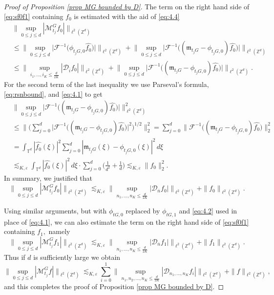 \documentclass[a4paper,oneside, reqno]{amsart}
\numberwithin{equation}{section}
\theoremstyle{definition}%
\theoremstyle{definition}
\theoremstyle{definition}%
\theoremstyle{definition}
\newcommand{\Z}{\mathbb{Z}}
\newcommand{\T}{\mathbb{T}}
\begin{document}
\begin{proof}[Proof of Proposition \ref{prop MG bounded by D}]
The  term on the right hand side of \eqref{eq:sf0f1}  containing $f_0$ is estimated with the aid of \eqref{eq:4.4} 
\begin{align*}
&\Big\|\sup_{0 \le j \le d} |\mathcal{M}_{t_j}^Gf_0| \Big\|_{\ell^2(\Z^d)} \\
&\leq \Big\|  \sup_{0 \le j \le d} \Big|\mathcal{F}^{-1} \Big( \phi_{t_jG,0}\widehat{f_0} \Big)\Big| \Big\|_{\ell^2(\Z^d)} +\Big\|  \sup_{ 0 \le j \le d} \Big|\mathcal{F}^{-1} \Big( (\mathfrak{m}_{t_jG}-\phi_{t_jG,0})\widehat{f_0} \Big)\Big| \Big\|_{\ell^2(\Z^d)}\\
&\le \Big\|\sup_{i_1,...,i_K \leq \frac{d}{2K}} |\mathcal{D}_{\overline{i}}f_0|\Big\|_{\ell^2(\Z^d)}+\Big\|  \sup_{ 0 \le j \le d} \Big|\mathcal{F}^{-1} \Big( (\mathfrak{m}_{t_jG}-\phi_{t_jG,0})\widehat{f_0} \Big)\Big| \Big\|_{\ell^2(\Z^d)}.
\end{align*} 
For the second term of the last inequality we use Parseval's formula, \eqref{eq:rsnbound}, and \eqref{eq:4.1} to get
\begin{align*}
&\Big\|  \sup_{ 0 \le j \le d} \Big|\mathcal{F}^{-1} \Big( (\mathfrak{m}_{t_jG}-\phi_{t_jG,0})\widehat{f_0} \Big)\Big| \Big\|_{\ell^2(\Z^d)}^2 \\
&\leq \Big\| \Big(\sum_{j=0}^d \Big|\mathcal{F}^{-1} \Big( (\mathfrak{m}_{t_jG}-\phi_{t_jG,0})\widehat{f_0} \Big)\Big|^2 \Big)^{1/2} \Big\|_{2}^2 =\sum_{j=0}^d \Big\|\mathcal{F}^{-1} \Big( (\mathfrak{m}_{t_jG}-\phi_{t_jG,0})\widehat{f_0} \Big)\Big\|_{2}^2  \\
&=  \int_{\T^d} | \widehat{f_0}(\xi)|^2 \sum_{j=0}^d  |\mathfrak{m}_{t_jG}(\xi)-\phi_{t_jG,0}(\xi)|^2 \,d\xi 
\\
&\lesssim_{K, \varepsilon}  \int_{\T^d} | \widehat{f_0}(\xi)|^2\,d\xi \cdot \sum_{j=0}^d\big( \frac{1}{d^2}+ \frac{1}{d}\big)  \lesssim_{K, \varepsilon} \| f_0 \|_2^2.
\end{align*}
In summary, we justified that
\[
\Big\|\sup_{0 \le j \le d} |\mathcal{M}_{t_j}^Gf_0| \Big\|_{\ell^2(\Z^d)} \lesssim_{K,\varepsilon}  \Big\| \sup_{n_1,...,n_K \leq \frac{d}{2K}} |\mathcal{D}_{\overline{n}}f_0| \Big\|_{\ell^2(\Z^d)}+ \|f_0 \|_{\ell^2(\Z^d)}.
\]

Using similar arguments, but with $\phi_{tG,0}$ replaced by $\phi_{tG,1}$ and \eqref{eq:4.2} used in place of \eqref{eq:4.1}, we can also estimate the term on the right hand side of \eqref{eq:sf0f1} containing $f_1,$ namely
\[
\Big\|\sup_{0 \le j \le d} |\mathcal{M}_{t_j}^Gf_1| \Big\|_{\ell^2(\Z^d)} \lesssim_{K,\varepsilon}  \Big\| \sup_{n_1,...,n_K \leq \frac{d}{2K}} |\mathcal{D}_{\overline{n}}f_1| \Big\|_{\ell^2(\Z^d)}+ \|f_1 \|_{\ell^2(\Z^d)}.
\]
Thus if $d$ is sufficiently large we obtain
\[
   \Big\|\sup_{0 \le j \le d} |\mathcal{M}_{t_j}^Gf| \Big\|_{\ell^2(\Z^d)} \lesssim_{K,\varepsilon} \sum_{i=0}^1 \Big\| \sup_{n_1,n_2,...,n_K \leq \frac{d}{2K}} |\mathcal{D}_{n_1,...,n_K}f_i| \Big\|_{\ell^2(\Z^d)} + \|f\|_{\ell^2(\Z^d)},
   \]
and this completes the proof of Proposition \ref{prop MG bounded by D}.



\end{proof}
\end{document}
